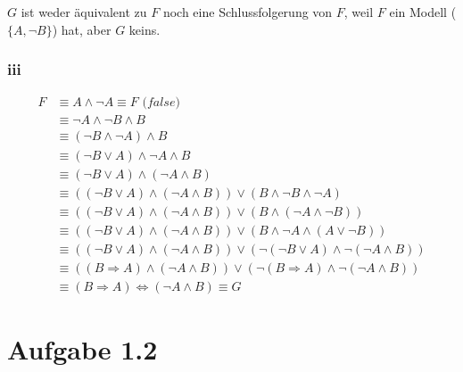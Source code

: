 \documentclass[10pt,a4paper]{article}
\begin{document}
$G$ ist weder äquivalent zu $F$ noch eine Schlussfolgerung von $F$, weil $F$ ein Modell ($\{A, \neg B\}$) hat, aber $G$ keins.

\subsubsection{iii}

\begin{align*}
  F & \equiv A \land \neg A \equiv F \textit{ (false)}\\
  & \equiv \neg A \land \neg B \land B\\
  & \equiv (\neg B \land \neg A) \land B\\
  & \equiv (\neg B \lor A) \land \neg A \land B\\
  & \equiv (\neg B \lor A) \land (\neg A \land B)\\
  & \equiv ((\neg B \lor A) \land (\neg A \land B)) \lor (B \land \neg B \land \neg A)\\
  & \equiv ((\neg B \lor A) \land (\neg A \land B)) \lor (B \land (\neg A \land \neg B))\\
  & \equiv ((\neg B \lor A) \land (\neg A \land B)) \lor (B \land \neg A \land (A \lor \neg B))\\
  & \equiv ((\neg B \lor A) \land (\neg A \land B)) \lor (\neg (\neg B \lor A) \land \neg (\neg A \land B))\\
  & \equiv ((B \Rightarrow A) \land (\neg A \land B)) \lor (\neg (B \Rightarrow A) \land \neg (\neg A \land B))\\
  & \equiv (B \Rightarrow A) \Leftrightarrow (\neg A \land B) \equiv G
\end{align*}

\section{Aufgabe 1.2}
\end{document}
